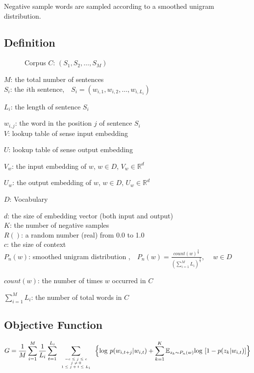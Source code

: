 \documentclass[12pt,a4paper,twoside]{book}
\begin{document}
Negative sample words are sampled according to a smoothed unigram distribution.
\subsection{Definition}
\ \ \ \ \ \ Corpus $C$: $(S_1,S_2,\ldots,S_M)$

$M$: the total number of sentences\\

$S_i$: the $i$th sentence,\ \ $S_i = (w_{i,1},w_{i,2},\ldots,w_{i,L_i})$

$L_i$: the length of sentence $S_i$

$w_{i,j}$: the word in the position $j$ of sentence $S_i$\\

$V$: lookup table of sense input embedding 

$U$: lookup table of  sense output embedding 

$V_w$: the input embedding of $w$, $w\in D$, $V_w \in \mathbb{R}^d$

$U_w$: the output embedding of $w$, $w\in D$, $U_w \in \mathbb{R}^d$

$D$: Vocabulary 

$d$: the size of embedding vector (both input and output)\\

$K$: the number of negative samples\\

$R()$: a random number (real) from 0.0 to 1.0\\

$c$: the size of context\\

$P_n(w)$: smoothed unigram distribution ,\ \ $P_n(w) = \frac{count(w)^{\frac{3}{4}}}{(\sum_{i=1}^M L_i)^{\frac{3}{4}}}$, \ \ $w\in D$

$count(w)$: the number of times $w$ occurred in $C$

$\sum_{i=1}^M L_i$: the number of total words in $C$
\subsection{Objective Function}
\begin{equation}
\begin{split}
G = \frac{1}{M}\sum_{i=1}^M\frac{1}{L_i}\sum_{t=1}^{L_i}\sum\limits_{\mbox{\tiny$\begin{array}{c}-c\leq j \leq c\\ j\neq 0\\ 1\leq j+t\leq L_i\end{array}$}}\Big \{\mathrm{log}\ p(w_{i,t+j}|w_{i,t}) 
+\sum\limits_{k=1}^K\mathbb{E}_{z_k\sim P_n(w)}\mathrm{log}\ [1-p(z_k|w_{i,t}) ] \Big \}
\end{split}
\end{equation} 
\end{document}

